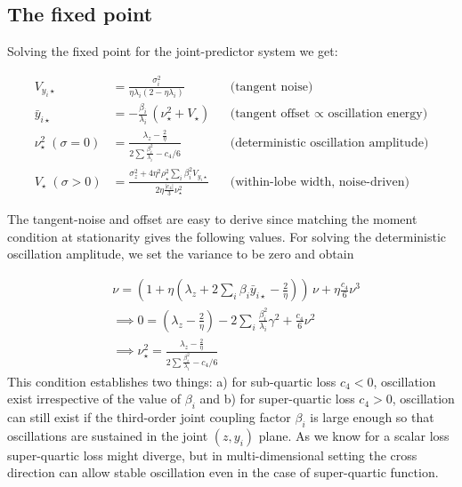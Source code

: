 \documentclass{article} %
\theoremstyle{plain}
\theoremstyle{definition}
\newcommand{\ybar}{\bar{y}}
\begin{document}
\begin{itemize}[nosep,leftmargin=*]
\section{The fixed point}
\label{sec:fixedpoint}
 
Solving the fixed point for the joint-predictor system we get:
 
\begin{equation*}
\boxed{\begin{aligned}
V_{y_i\star} &= \frac{\sigma_i^2}{\eta\lambda_i(2-\eta\lambda_i)}
&&\text{(tangent noise)}\\[4pt]
\ybar_{i\star} &= -\frac{\beta_i}{\lambda_i}\,(\nu_\star^2+V_\star)
&&\text{(tangent offset $\propto$ oscillation energy)}\\[4pt]
\nu_\star^2\;(\sigma=0) &= \frac{\lambda_{z}-\frac{2}{\eta}}{2\sum \frac{\beta^2_{i}}{\lambda_{i}}-c_4/6}
&&\text{(deterministic oscillation amplitude)}\\[4pt]
V_\star\;(\sigma>0) &= \frac{\sigma_z^2+4\eta^2\rho_\star^2\sum_i\beta_i^2V_{y_i\star}}
{2\eta\frac{|c_4|}{3}\nu_\star^2}
&&\text{(within-lobe width, noise-driven)}
\end{aligned}}
\label{eq:fixedpoint}
\end{equation*}

The tangent-noise and offset are easy to derive since matching the moment condition at stationarity gives the following values. For solving the deterministic oscillation amplitude, we set the variance to be zero and obtain 

\begin{align}
   & \nu = (1+\eta (\lambda_z + 2\sum_i \beta_i \ybar_{i\star}  - \frac{2}{\eta}))\,\nu
 + \eta\frac{c_4}{6}\nu^3 \\
 & \implies 0 = (\lambda_z- \frac{2}{\eta}) -2 \sum_i \frac{\beta_i ^2}{\lambda_{i}} \gamma^2 + \frac{c_4}{6}\nu^2 \\ 
 & \implies \nu_\star^2= \frac{\lambda_{z}-\frac{2}{\eta}}{2\sum \frac{\beta^2_{i}}{\lambda_{i}}-c_4/6}
\end{align}
This condition establishes two things: a) for sub-quartic loss $c_{4}<0$, oscillation exist irrespective of the value of $\beta_{i}$ and b) for super-quartic loss $c_{4}>0$, oscillation can still exist if the third-order joint coupling factor $\beta_{i}$ is large enough so that oscillations are sustained in the joint $(z, y_{i})$ plane.
As we know for a scalar loss super-quartic loss might diverge, but in multi-dimensional setting the cross direction can allow stable oscillation even in the case of super-quartic function.


\end{itemize}
\end{document}
